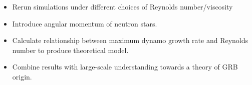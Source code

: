 \documentclass[20pt]{extarticle}
\begin{document}
\begin{tcbposter}
{    \begin{itemize}
      \item Rerun simulations under different choices of Reynolds number/viscosity
      \item Introduce angular momentum of neutron stars.
      \item Calculate relationship between maximum dynamo growth rate and Reynolds number to produce theoretical model.
      \item Combine results with large-scale understanding towards a theory of GRB origin.
    \end{itemize}
  }
\end{tcbposter}
\end{document}
